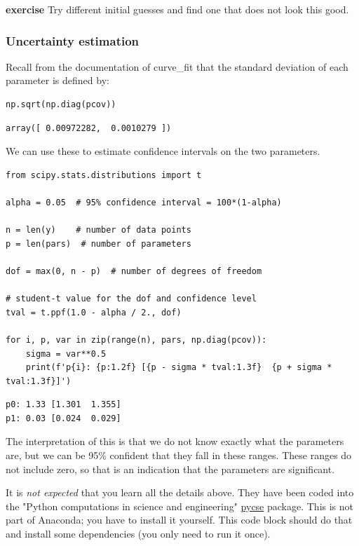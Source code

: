 \documentclass[11pt]{article}
\begin{document}
\textbf{exercise} Try different initial guesses and find one that does not look this good.

\subsubsection{Uncertainty estimation}
\label{sec:org3549911}

Recall from the documentation of curve\_fit that the standard deviation of each parameter is defined by:

\begin{verbatim}
np.sqrt(np.diag(pcov))
\end{verbatim}

\begin{verbatim}
array([ 0.00972282,  0.0010279 ])
\end{verbatim}

We can use these to estimate confidence intervals on the two parameters.

\begin{verbatim}
from scipy.stats.distributions import t

alpha = 0.05  # 95% confidence interval = 100*(1-alpha)

n = len(y)    # number of data points
p = len(pars)  # number of parameters

dof = max(0, n - p)  # number of degrees of freedom

# student-t value for the dof and confidence level
tval = t.ppf(1.0 - alpha / 2., dof)

for i, p, var in zip(range(n), pars, np.diag(pcov)):
    sigma = var**0.5
    print(f'p{i}: {p:1.2f} [{p - sigma * tval:1.3f}  {p + sigma * tval:1.3f}]')
\end{verbatim}

\begin{verbatim}
p0: 1.33 [1.301  1.355]
p1: 0.03 [0.024  0.029]

\end{verbatim}

The interpretation of this is that we do not know exactly what the parameters are, but we can be 95\% confident that they fall in these ranges. These ranges do not include zero, so that is an indication that the parameters are significant.

It is \emph{not expected} that you learn all the details above. They have been coded into the "Python computations in science and engineering" \href{https://kitchingroup.cheme.cmu.edu/pycse/}{pycse} package. This is not part of Anaconda; you have to install it yourself. This code block should do that and install some dependencies (you only need to run it once).
\end{document}
